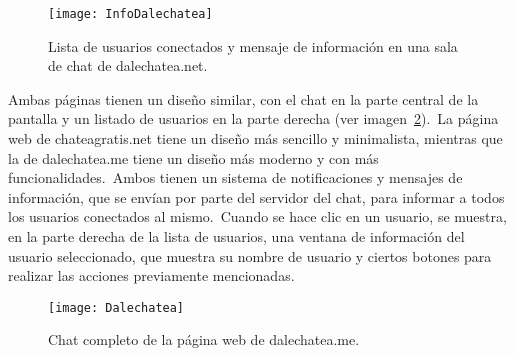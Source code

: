 \begin{itemize}
	\begin{figure}[H]
		\centering
		\hspace{1.5cm}
		\texttt{[image: InfoDalechatea]}
		\caption{Lista de usuarios conectados y mensaje de información en una sala de chat de dalechatea.net.}
		\label{fig:UsuariosEInfoDalechatea}
	\end{figure}

\end{itemize}
\label{itm:estadoDelArte}

Ambas páginas tienen un diseño similar, con el chat en la parte central de la pantalla y un listado de usuarios en
la parte derecha (ver imagen~\ref{fig:chatCompleto}).\ La página web de chateagratis.net tiene un diseño más sencillo
y minimalista, mientras que la de
dalechatea.me tiene un diseño más moderno y con más funcionalidades.\ Ambos tienen un sistema de notificaciones y
mensajes de información, que se envían por parte del servidor del chat, para informar a todos los usuarios conectados
al mismo.\ Cuando se hace clic en un usuario, se muestra, en la parte derecha de la lista de usuarios, una ventana de
información del usuario seleccionado, que muestra su nombre de usuario y ciertos botones para realizar las acciones
previamente mencionadas.


\begin{figure}[H]
	\centering
	\texttt{[image: Dalechatea]}
	\caption{Chat completo de la página web de dalechatea.me.}
	\label{fig:chatCompleto}
\end{figure}


